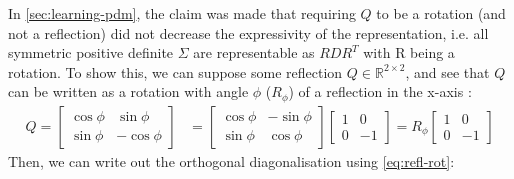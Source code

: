 \documentclass[a4paper, 12pt]{report}
\begin{document}
In \ref{sec:learning-pdm}, the claim was made that requiring $Q$ to be a rotation (and not a reflection) did not decrease the expressivity of the representation, i.e. all symmetric positive definite $\Sigma$ are representable as $RDR^T$ with R being a rotation. To show this, we can suppose some reflection $Q\in \mathbb{R}^{2\times 2}$, and see that $Q$ can be written as a rotation with angle $\phi$ ($R_\phi$) of a reflection in the x-axis \cite{poole2015linear}:
\begin{align}
	Q=\begin{bmatrix}
		\cos \phi  &  \sin \phi  \\
		\sin \phi  &  -\cos \phi
	\end{bmatrix} &= \begin{bmatrix}
		\cos \phi  &  -\sin \phi  \\
		\sin \phi  &  \cos \phi
	\end{bmatrix} \begin{bmatrix}
		1  &  0  \\
		0  &  -1
	\end{bmatrix} = R_\phi \begin{bmatrix}
		1  &  0  \\
		0  &  -1
	\end{bmatrix} \label{eq:refl-rot}
\end{align}
Then, we can write out the orthogonal diagonalisation using \ref{eq:refl-rot}:
\end{document}
